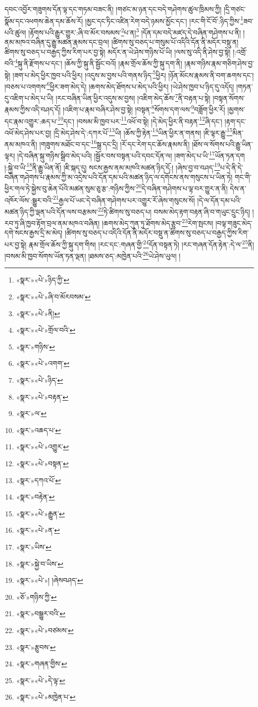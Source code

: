དབང་འབྱོར་གཟུགས་དོན་ལྟ་དང་གཏམ་བཟང་ནི། །གཙང་མ་ཉན་དང་བདེ་གཤེགས་ཚུལ་ཁྲིམས་ཀྱི། །དྲི་གཙང་སྣོམ་དང་འཕགས་ཆེན་དམ་ཆོས་རོ། །མྱང་དང་ཏིང་འཛིན་རེག་བདེ་ཉམས་མྱོང་དང་། །རང་གི་ངོ་བོ་:ཉིད་ཀྱིས་\footnote{«སྣར་»«པེ་»ཉིད་ཀྱི་}ཟབ་པའི་ཚུལ། །རྟོགས་པའི་རྒྱུར་གྱུར་:ཞི་བ་མོར་བསམས་\footnote{«སྣར་»«པེ་»ཞི་བ་མོརབསམ་}པ་ན།\footnote{«སྣར་»«པེ་»ནི།} །དོན་དམ་བདེ་མཛད་དེ་བཞིན་གཤེགས་པ་ནི། །ནམ་མཁའ་བཞིན་དུ་རྒྱུ་མཚན་རྣམས་དང་བྲལ། །ཚིགས་སུ་བཅད་པ་གསུམ་པོ་འདིའི་དོན་ནི་མདོར་བསྡུ་ན། ཚིགས་སུ་བཅད་པ་བརྒྱད་ཀྱིས་རིག་པར་བྱ་སྟེ། མདོར་ན་ཡེ་ཤེས་གཉིས་པོ་ཡི། །ལས་སུ་འདི་ནི་ཤེས་བྱ་སྟེ། །:འགྲོ་བའི་\footnote{«སྣར་»«པེ་»གྲོལ་བའི་}སྐུ་ནི་རྫོགས་པ་དང་། །ཆོས་ཀྱི་སྐུ་ནི་སྦྱོང་བའོ། །རྣམ་གྲོལ་ཆོས་ཀྱི་སྐུ་དག་ནི། །རྣམ་གཉིས་རྣམ་གཅིག་ཤེས་བྱ་སྟེ། །ཟག་པ་མེད་ཕྱིར་ཁྱབ་པའི་ཕྱིར། །འདུས་མ་བྱས་པའི་གནས་ཉིད་\footnote{«སྣར་»གཉིས་}ཕྱིར། །ཉོན་མོངས་རྣམས་ནི་བག་ཆགས་དང་། །བཅས་པ་འགགས་\footnote{«སྣར་»«པེ་»འགག་}ཕྱིར་ཟག་མེད་དེ། །ཆགས་མེད་ཐོགས་པ་མེད་པའི་ཕྱིར། །ཡེ་ཤེས་ཁྱབ་པ་ཉིད་དུ་འདོད། །གཏན་དུ་འཇིག་པ་མེད་པ་ཡི། །རང་བཞིན་ཡིན་ཕྱིར་འདུས་མ་བྱས། །འཇིག་མེད་ཆོས་\footnote{«སྣར་»«པེ་»ཉིད་}ནི་བརྟན་པ་སྟེ། །བསྟན་སོགས་རྣམས་ཀྱིས་འདི་བཤད་དོ། །འཇིག་པ་རྣམ་བཞིར་ཤེས་བྱ་སྟེ། །བསྟན་\footnote{«སྣར་»«པེ་»བརྟན་}སོགས་དག་ལས་\footnote{«སྣར་»ལ་}བཟློག་ཕྱིར་རོ། །མྱགས་དང་རྣམ་འགྱུར་:ཆད་པ་\footnote{«སྣར་»འཆད་པ་}དང་། །བསམ་མི་ཁྱབ་པར་\footnote{«སྣར་»«པེ་»འགྱུར་}འཕོ་བ་སྟེ། །དེ་མེད་ཕྱིར་ནི་བརྟན་\footnote{«སྣར་»«པེ་»བསྟན་}ཞི་དང་། །རྟག་དང་འཕོ་མེད་ཤེས་པར་བྱ། །དྲི་མེད་ཤེས་དེ་:དཀར་པོ་\footnote{«སྣར་»དཀའ་པོ་}ཡི། །ཆོས་ཀྱི་རྟེན་\footnote{«སྣར་»བརྟེན་}ཡིན་ཕྱིར་ན་གནས། །ཇི་ལྟར་རྒྱུ་\footnote{«སྣར་»«པེ་»རྒྱུན་}མིན་ནམ་མཁའ་ནི། །གཟུགས་མཐོང་བ་དང་\footnote{«སྣར་»«པེ་»ན་}སྒྲ་དང་དྲི། །རོ་དང་རེག་དང་ཆོས་རྣམས་ནི། །ཐོས་ལ་སོགས་པའི་རྒྱུ་ཡིན་ལྟར། །དེ་བཞིན་སྐུ་གཉིས་སྒྲིབ་མེད་པའི། །སྦྱོར་བས་བསྟན་པའི་དབང་དོན་ལ། །ཟག་མེད་པ་ཡི་\footnote{«སྣར་»ཡིས་}ཡོན་ཏན་དག །:སྐྱེ་བ་ཡི་\footnote{«སྣར་»སྐྱེ་བ་ཡིས་}ནི་རྒྱུ་ཡིན་ནོ། །ཇི་སྐད་དུ། སངས་རྒྱས་ནམ་མཁའི་མཚན་ཉིད་དོ:། །ཞེས་བྱ་བ་བཤད་\footnote{«སྣར་»«པེ་»། །ཞེསབཤད་}པ་དེ་ནི་དེ་བཞིན་གཤེགས་པ་རྣམས་ཀྱི་མ་འདྲེས་པའི་དོན་དམ་པའི་མཚན་ཉིད་ལ་དགོངས་ནས་གསུངས་པ་ཡིན་ཏེ། གང་གི་ཕྱིར་གལ་ཏེ་སྐྱེས་བུ་ཆེན་པོའི་མཚན་སུམ་ཅུ་རྩ་:གཉིས་ཀྱིས་\footnote{«ཅོ་»གཉིས་ཀྱི་}དེ་བཞིན་གཤེགས་པ་ལྟ་བར་གྱུར་ན་ནི། དེས་ན་འཁོར་ལོས་:སྒྱུར་བའི་\footnote{«སྣར་»བསྒྱུར་བའི་}རྒྱལ་པོ་ཡང་དེ་བཞིན་གཤེགས་པར་འགྱུར་རོ་ཞེས་གསུངས་སོ། །དེ་ལ་དོན་དམ་པའི་མཚན་ཉིད་ཀྱི་ལྡན་པའི་དོན་ལས་བརྩམས་\footnote{«སྣར་»«པེ་»བཙམས་}ཏེ་ཚིགས་སུ་བཅད་པ། བསམ་མེད་རྟག་བརྟན་ཞི་བ་གཡུང་དྲུང་ཉིད། །རབ་ཏུ་ཞི་ཁྱབ་རྟོག་བྲལ་ནམ་མཁའ་བཞིན། །ཆགས་མེད་ཀུན་ཏུ་ཐོགས་མེད་རྩུབ་\footnote{«སྣར་»རྩུབས་}རེག་སྤངས། །བལྟ་གཟུང་མེད་དགེ་སངས་རྒྱས་དྲི་མ་མེད། །ཚིགས་སུ་བཅད་པ་འདིའི་དོན་ནི་མདོར་བསྡུ་ན་ཚིགས་སུ་བཅད་པ་བརྒྱད་ཀྱིས་རིག་པར་བྱ་སྟེ། རྣམ་གྲོལ་ཆོས་ཀྱི་སྐུ་དག་གིས། །རང་དང་:གཞན་གྱི་\footnote{«སྣར་»གཞན་གྱིས་}དོན་བསྟན་ཏེ། །རང་གཞན་དོན་རྟེན་:དེ་ལ་\footnote{«སྣར་»«པེ་»དེ་ལྟ་}ནི། །བསམ་མི་ཁྱབ་སོགས་ཡོན་ཏན་ལྡན། །ཐམས་ཅད་:མཁྱེན་པའི་\footnote{«སྣར་»«པེ་»མཁྱེན་པ་}ཡེ་ཤེས་ཡུལ། །
